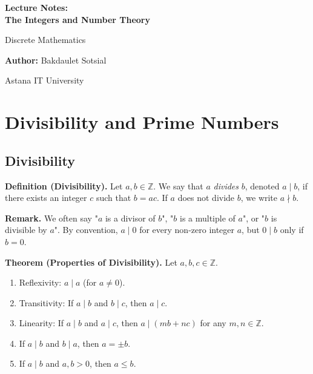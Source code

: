\documentclass[11pt,a4paper]{article}
\begin{document}
\begin{titlepage}
    \centering
    \vspace*{4cm}
    
    {\Huge\bfseries Lecture Notes:\\ The Integers and Number Theory\par}
    \vspace{1cm}
    {\Large Discrete Mathematics\par}
    \vspace{2cm}
    {\large \textbf{Author:} Bakdaulet Sotsial\par}
    \vspace{1cm}
    
    \vfill
    {\small Astana IT University \par}
    \vspace*{2cm}
\end{titlepage}

\tableofcontents
\newpage

\section{Divisibility and Prime Numbers}

\subsection{Divisibility}

\textbf{Definition (Divisibility).} Let $a, b \in \mathbb{Z}$. We say that $a$ \textit{divides} $b$, denoted $a \mid b$, if there exists an integer $c$ such that $b = ac$. If $a$ does not divide $b$, we write $a \nmid b$.

\textbf{Remark.} We often say "$a$ is a divisor of $b$", "$b$ is a multiple of $a$", or "$b$ is divisible by $a$". By convention, $a \mid 0$ for every non-zero integer $a$, but $0 \mid b$ only if $b = 0$.

\textbf{Theorem (Properties of Divisibility).} Let $a, b, c \in \mathbb{Z}$.
\begin{enumerate}[label=(\roman*)]
    \item Reflexivity: $a \mid a$ (for $a \neq 0$).
    \item Transitivity: If $a \mid b$ and $b \mid c$, then $a \mid c$.
    \item Linearity: If $a \mid b$ and $a \mid c$, then $a \mid (mb + nc)$ for any $m, n \in \mathbb{Z}$.
    \item If $a \mid b$ and $b \mid a$, then $a = \pm b$.
    \item If $a \mid b$ and $a, b > 0$, then $a \leq b$.
\end{enumerate}
\end{document}
